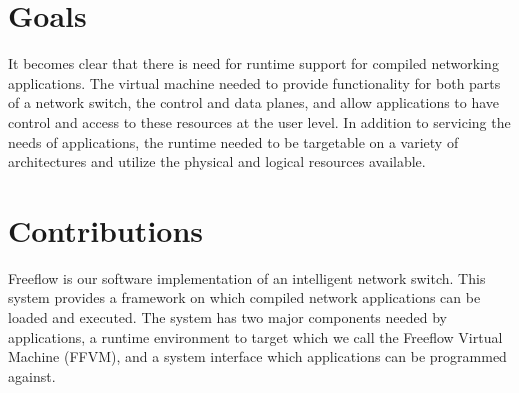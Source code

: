 
\section{Goals}
It becomes clear that there is need for runtime support for compiled 
networking applications. The virtual machine needed to provide functionality 
for both parts of a network switch, the control and data planes, and allow 
applications to have control and access to these resources at the user level. 
In addition to servicing the needs of applications, the runtime needed to be 
targetable on a variety of architectures and utilize the physical and logical 
resources available. 


\section{Contributions}
Freeflow is our software implementation of an intelligent network switch. This
system provides a framework on which compiled network applications can be
loaded and executed. The system has two major components needed by
applications, a runtime environment to target which we call the Freeflow
Virtual Machine (FFVM), and a system interface which applications can be
programmed against.

